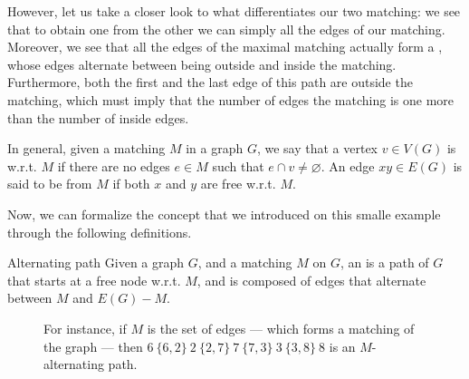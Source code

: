 \documentclass[a4paper, 12pt]{report}
\begin{document}
    However, let us take a closer look to what differentiates our two matching: we see that to obtain one from the other we can simply  all the edges of our matching. Moreover, we see that all the edges of the maximal matching actually form a , whose edges alternate between being outside and inside the matching. Furthermore, both the first and the last edge of this path are outside the matching, which must imply that the number of edges  the matching is one more than the number of inside edges.

    In general, given a matching $M$ in a graph $G$, we say that a vertex $v \in V(G)$ is  w.r.t. $M$ if there are no edges $e \in M$ such that $e \cap v \neq \varnothing$. An edge $xy \in E(G)$ is said to be  from $M$ if both $x$ and $y$ are free w.r.t. $M$.

    Now, we can formalize the concept that we introduced on this smalle example through the following definitions.

    \begin{frameddefn}{Alternating path}
        Given a graph $G$, and a matching $M$ on $G$, an  is a path of $G$ that starts at a free node w.r.t. $M$, and is composed of edges that alternate between $M$ and $E(G) - M$.
    \end{frameddefn}

        \begin{figure}[H]
        \centering
        \caption{For instance, if $M$ is the set of  edges --- which forms a matching of the graph --- then $6 \ \{6, 2\} \ 2 \ \{2, 7\} \ 7 \ \{7, 3\} \ 3 \ \{3, 8\} \ 8$ is an $M$-alternating path.}
    \end{figure}
\end{document}
